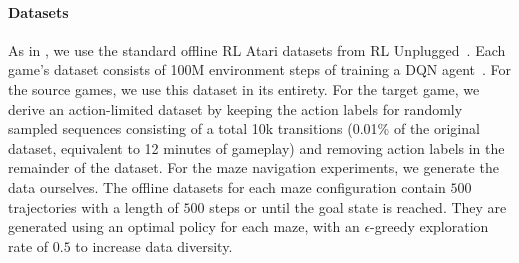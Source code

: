 \documentclass{article} %
\newcommand{\ofir}[1]{{\color{blue} Ofir: #1}}
\begin{document}
\paragraph{Datasets}  
As in \citet{https://doi.org/10.48550/arxiv.2205.15241}, we use the standard offline RL Atari datasets from RL Unplugged~\citep{gulcehre2020rl}. Each game's dataset consists of 100M environment steps of training a DQN agent~\citep{agarwal2020optimistic}.
For the source games, we use this dataset in its entirety. For the target game, we derive an action-limited dataset by keeping the action labels for randomly sampled sequences consisting of a total 10k transitions (0.01\% of the original dataset, equivalent to 12 minutes of gameplay) and removing action labels in the remainder of the dataset. For the maze navigation experiments, we generate the data ourselves.  The offline datasets for each maze configuration contain $500$ trajectories with a length of $500$ steps or until the goal state is reached.  They are generated using an optimal policy for each maze, with an $\epsilon$-greedy exploration rate of $0.5$ to increase data diversity.



\end{document}
